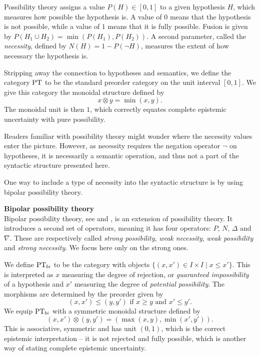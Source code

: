 Possibility theory assigns a value $P(H)\in [0,1]$ to a given hypothesis $H$, which measures how possible the hypothesis is. A value of $0$ means that the hypothesis is not possible, while a value of $1$ means that it is fully possible. Fusion is given by $P(H_1\cup H_2)=\min(P(H_1), P(H_2))$. A second parameter, called the \emph{necessity}, defined by $N(H)=1-P(\neg H)$, measures the extent of how necessary the hypothesis is. 

Stripping away the connection to hypotheses and semantics, we define the category $\mathrm{PT}$ to be the standard preorder category on the unit interval $[0,1]$. We give this category the monoidal structure defined by 
\[x \otimes y = \min(x,y).\]
The monoidal unit is then $1$, which correctly equates complete epistemic uncertainty with pure possibility.  

Readers familiar with possibility theory might wonder where the necessity values enter the picture. However, as necessity requires the negation operator $\neg$ on hypotheses, it is necessarily a semantic operation, and thus not a part of the syntactic structure presented here. 

One way to include a type of necessity into the syntactic structure is by using bipolar possibility theory. 


\textbf{Bipolar possibility theory} \\
Bipolar possibility theory, see \cite{benferhat-dubois-kaci-prade_2006} and \cite{dubois-lorini-prade_2013}, is an extension of possibility theory. It introduces a second set of operators, meaning it has four operators: $P$, $N$, $\Delta$ and $\nabla$. These are respectively called \emph{strong possibility}, \emph{weak necessity}, \emph{weak possibility} and \emph{strong necessity}. We focus here only on the strong ones. 

We define $\mathrm{PT}_{bi}$ to be the category with objects $\{(x, x')\in I\times I \mid x \leq x'\}$. This is interpreted as $x$ measuring the degree of rejection, or \emph{guaranteed impossibility} of a hypothesis and $x'$ measuring the degree of \emph{potential possibility}. The morphisms are determined by the preorder given by 
\[(x, x') \leq (y, y') \text{ if } x \geq y \text{ and } x'\leq y'.\]
We equip $\mathrm{PT}_{bi}$ with a symmetric monoidal structure defined by 
\[(x,x')\otimes (y,y') = (\max(x,y), \min(x',y')).\]
This is associative, symmetric and has unit $(0,1)$, which is the correct epistemic interpretation -- it is not rejected and fully possible, which is another way of stating complete epistemic uncertainty. 


